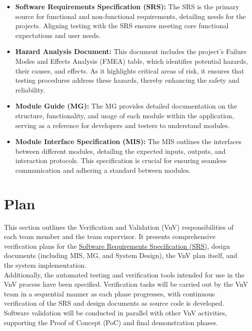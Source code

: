 \documentclass[12pt, titlepage]{article}
\begin{document}
\begin{itemize}
    \item \textbf{Software Requirements Specification (SRS):} The SRS is the
    primary source for functional and non-functional requirements, detailing
    needs for the projects. Aligning testing with the SRS ensures meeting core
    functional expectations and user needs.
    
    \item \textbf{Hazard Analysis Document:} This document includes the
    project’s Failure Modes and Effects Analysis (FMEA) table, which identifies
    potential hazards, their causes, and effects. As it highlights critical
    areas of risk, it ensures that testing procedures address these hazards,
    thereby enhancing the safety and reliability.

    \item \textbf{Module Guide (MG):} The MG provides detailed documentation on
    the structure, functionality, and usage of each module within the
    application, serving as a reference for developers and testers to understand
    modules.

    \item \textbf{Module Interface Specification (MIS):} The MIS outlines the
    interfaces between different modules, detailing the expected inputs,
    outputs, and interaction protocols. This specification is crucial for
    ensuring seamless communication and adhering a standard between modules.
\end{itemize}



\section{Plan}
This section outlines the Verification and Validation (VnV) responsibilities of each 
team member and the team supervisor. It presents comprehensive verification plans for the 
\href{https://github.com/SumanyaG/Alkalytics/blob/f856af96669275cc29428a8f2cd4b863e4523ff6/docs/SRS/SRS.pdf}{Software Requirements Specification (SRS)},
design documents (including MIS, MG, and System Design), the VnV plan itself, and the system implementation.\\
\newline Additionally, the automated testing and verification tools intended for use in the VnV process
have been specified. Verification tasks will be carried out by the VnV team in a sequential manner
as each phase progresses, with continuous verification of the SRS and design documents as source code
is developed. Software validation will be conducted in parallel with other VnV activities, 
supporting the Proof of Concept (PoC) and final demonstration phases.
\end{document}
